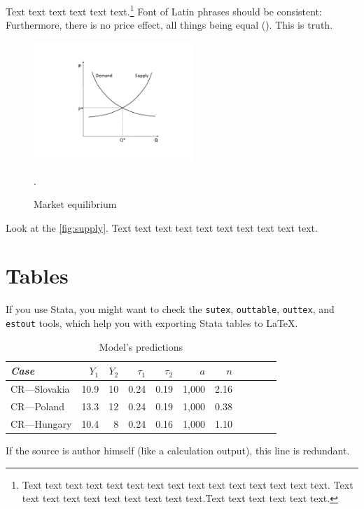 Text text text text text text.\footnote{Text text text text text text text text text text text text text text text. Text text text text text text text text text text.Text text text text text text.}
Font of Latin phrases should be consistent: Furthermore, there is no  price effect, all things being equal (). This is  truth.

\begin{figure}[!htbp]
\begin{center}
\caption{Market equilibrium}
\label{fig:supply}
\includegraphics[width=60mm]{Figures/supplydemand}
\end{center}\vspace{-0.5cm}
\begin{source}\cite{Haufler2006}.\end{source}
\end{figure}

Look at the \autoref{fig:supply}. Text text text text text text text text text text.



\section{Tables}

If you use Stata, you might want to check the \texttt{sutex}, \texttt{outtable}, \texttt{outtex}, and \texttt{estout} tools, which help you with exporting Stata tables to \LaTeX{}.

\begin{table}[!htbp]
\begin{center}
	\caption[Calibration table]{Model's predictions}\label{tab:values}
\begin{tabular}{lrrrrrrrrrr}
\toprule
\textit{Case} &        $Y_1$ &        $Y_2$ &  $\tau_1$ &  $\tau_2$ &          $a$ &          $n$\\
\midrule
CR---Slovakia &       10.9 &         10 &       0.24 &       0.19 &          1,000 &       2.16\\

CR---Poland &       13.3 &         12 &       0.24 &       0.19 &          1,000 &       0.38\\

CR---Hungary &       10.4 &          8 &       0.24 &       0.16 &          1,000 &        1.10\\
\bottomrule
\end{tabular}  
\end{center}
\begin{source} If the source is author himself (like a calculation output), this line is redundant.\end{source}
\end{table}


